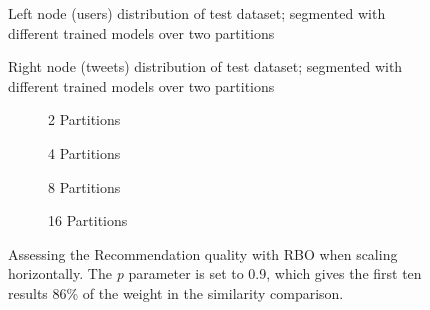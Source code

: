 
\begin{figure}[!htb]
	\centering
	
	\caption{Left node (users) distribution of test dataset; segmented with different trained models over two partitions}
	\label{plot:left-node-distribution}
\end{figure}

\begin{figure}[!htb]
	\centering
	
	\caption{Right node (tweets) distribution of test dataset; segmented with different trained models over two partitions}
	\label{plot:right-node-distribution}
\end{figure}




\begin{figure}[!htb]
	\centering
	\begin{subfigure}[b]{0.5\linewidth}
	  \centering
	  
	  \caption{2 Partitions} 
	  \label{fig:RBO-horizontal-scaling-2-partitions-a} 
	  \vspace{1cm}
	\end{subfigure}%
	\begin{subfigure}[b]{0.5\linewidth}
	  \centering
	  
	  \caption{4 Partitions} 
	  \label{fig:RBO-horizontal-scaling-4-partitions-b} 
	  \vspace{1cm}
	\end{subfigure} 
	\begin{subfigure}[b]{0.5\linewidth}
	  \centering
	  
	  \caption{8 Partitions} 
	  \label{fig:RBO-horizontal-scaling-8-partitions-c} 
	\end{subfigure}%
	\begin{subfigure}[b]{0.5\linewidth}
	  \centering
	  
	  \caption{16 Partitions} 
	  \label{fig:RBO-horizontal-scaling-16-partitions-d} 
	\end{subfigure} 
	\caption{Assessing the Recommendation quality with RBO when scaling horizontally. The \emph{p} parameter is set to 0.9, which gives the first ten results 86\% of the weight in the similarity comparison.}
	\label{fig:RBO-horizontal-scaling} 
\end{figure}
